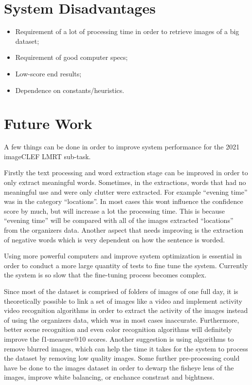 \section{System Disadvantages}

\begin{itemize}
    \itemsep0em
    \item Requirement of a lot of processing time in order to retrieve images of a big dataset;
    \item Requirement of  good computer specs;
    \item Low-score end results;
    \item Dependence on constants/heuristics.
\end{itemize}

\section{Future Work}

A few things can be done in order to improve system performance for the 2021 imageCLEF LMRT sub-task.

Firstly the text processing and word extraction stage can be improved in order to only extract meaningful words. Sometimes, in the extractions, words that had no meaningful use and were only clutter were extracted. For example \enquote{evening time} was in the category \enquote{locations}. In most cases this wont influence the confidence score by much, but will increase a lot the processing time. This is because \enquote{evening time} will be compared with all of the images extracted \enquote{locations} from the organizers data. Another aspect that needs improving is the extraction of negative words which is very dependent on how the sentence is worded.

Using more powerful computers and improve system optimization is essential in order to conduct a more large quantity of tests to fine tune the system. Currently the system is so slow that the fine-tuning process becomes complex.

Since most of the dataset is comprised of folders of images of one full day, it is theoretically possible to link a set of images like a video and implement activity video recognition algorithms in order to extract the activity of the images instead of using the organizers data, which was in most cases inaccurate. Furthermore, better scene recognition and even color recognition algorithms will definitely improve the f1-measure@10 scores. Another suggestion is using algorithms to remove blurred images, which can help the time it takes for the system to process the dataset by removing low quality images. Some further pre-processing could have be done to the images dataset in order to dewarp the fisheye lens of the images, improve white balancing, or enchance constrast and bightness.

